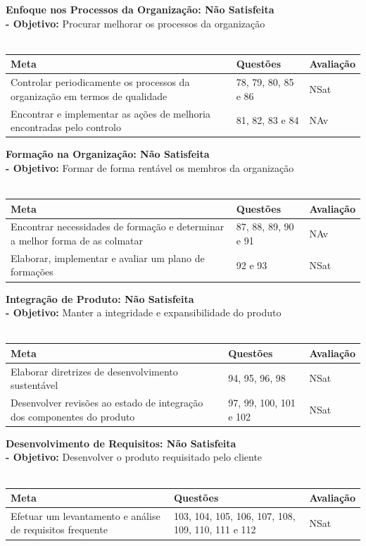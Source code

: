 \documentclass[openany,10pt,a4paper]{article}
\begin{document}
\textbf{Enfoque nos Processos da Organização: Não Satisfeita} \\ 
\textbf{- Objetivo:} Procurar melhorar os processos da organização \\
\\
\begin{tabular}{|p{3.7in}|p{1in}|p{1in}|}	\hline	
\textbf{Meta} & \textbf{Questões} & \textbf{Avaliação} \\ \hline
Controlar periodicamente os processos da organização em termos de qualidade & 78, 79, 80, 85 e 86 & NSat \\
Encontrar e implementar as ações de melhoria encontradas pelo controlo & 81, 82, 83 e 84 & NAv \\ \hline
\end{tabular}

\textbf{Formação na Organização: Não Satisfeita} \\ 
\textbf{- Objetivo:} Formar de forma rentável os membros da organização \\
\\
\begin{tabular}{|p{3.7in}|p{1in}|p{1in}|}		\hline
\textbf{Meta} & \textbf{Questões} & \textbf{Avaliação} \\ \hline
Encontrar necessidades de formação e determinar a melhor forma de as colmatar & 87, 88, 89, 90 e 91 & NAv \\
Elaborar, implementar e avaliar um plano de formações & 92 e 93 & NSat \\ \hline
\end{tabular}

\textbf{Integração de Produto:  Não Satisfeita} \\ 
\textbf{- Objetivo:} Manter a integridade e expansibilidade do produto \\
\\
\begin{tabular}{|p{3.7in}|p{1in}|p{1in}|}		\hline
\textbf{Meta} & \textbf{Questões} & \textbf{Avaliação} \\ \hline
Elaborar diretrizes de desenvolvimento sustentável & 94, 95, 96, 98 & NSat \\
Desenvolver revisões ao estado de integração dos componentes do produto & 97, 99, 100, 101 e 102 & NSat \\ \hline
\end{tabular}

\textbf{Desenvolvimento de Requisitos: Não Satisfeita} \\ 
\textbf{- Objetivo:} Desenvolver o produto requisitado pelo cliente \\
\\
\begin{tabular}{|p{3.7in}|p{1in}|p{1in}|}	\hline
\textbf{Meta} & \textbf{Questões} & \textbf{Avaliação} \\ \hline
Efetuar um levantamento e análise de requisitos frequente & 103, 104, 105, 106, 107, 108, 109, 110, 111 e 112 & NSat \\ \hline
\end{tabular}
\end{document}
